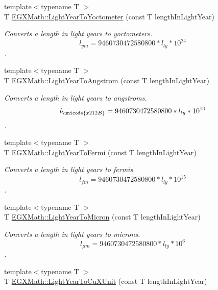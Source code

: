 \begin{DoxyCompactItemize}
{\footnotesize template$<$typename T $>$ }\\T \mbox{\hyperlink{group___e_g_x_math-_conversions-_length_conversions-_astronomical-_light_year-_s_i_ga2e306829867215c96b04e558db7d15b9}{E\+G\+X\+Math\+::\+Light\+Year\+To\+Yoctometer}} (const T length\+In\+Light\+Year)
\begin{DoxyCompactList}\small\item\em Converts a length in light years to yoctometers. \[ l_{ym}=9460730472580800 * l_{ly} * 10^{24} \]. \end{DoxyCompactList}\item 
{\footnotesize template$<$typename T $>$ }\\T \mbox{\hyperlink{group___e_g_x_math-_conversions-_length_conversions-_astronomical-_light_year-_non-_s_i_ga09634a7c514e3a0f573e7c171a791f78}{E\+G\+X\+Math\+::\+Light\+Year\+To\+Angstrom}} (const T length\+In\+Light\+Year)
\begin{DoxyCompactList}\small\item\em Converts a length in light years to angstroms. \[ l_{\unicode{x212B}}=9460730472580800 * l_{ly} * 10^{10} \]. \end{DoxyCompactList}\item 
{\footnotesize template$<$typename T $>$ }\\T \mbox{\hyperlink{group___e_g_x_math-_conversions-_length_conversions-_astronomical-_light_year-_non-_s_i_gaf3a2acd1e1653e2cecd6c299abe78524}{E\+G\+X\+Math\+::\+Light\+Year\+To\+Fermi}} (const T length\+In\+Light\+Year)
\begin{DoxyCompactList}\small\item\em Converts a length in light years to fermis. \[ l_{fm}=9460730472580800 * l_{ly} * 10^{15} \]. \end{DoxyCompactList}\item 
{\footnotesize template$<$typename T $>$ }\\T \mbox{\hyperlink{group___e_g_x_math-_conversions-_length_conversions-_astronomical-_light_year-_non-_s_i_gaa1be4e14f5ac7b272f28ce3e115b61c7}{E\+G\+X\+Math\+::\+Light\+Year\+To\+Micron}} (const T length\+In\+Light\+Year)
\begin{DoxyCompactList}\small\item\em Converts a length in light years to microns. \[ l_{\mu m}=9460730472580800 * l_{ly} * 10^{6} \]. \end{DoxyCompactList}\item 
{\footnotesize template$<$typename T $>$ }\\T \mbox{\hyperlink{group___e_g_x_math-_conversions-_length_conversions-_astronomical-_light_year-_non-_s_i_ga2a345996e344d547ea6db8b7e9174ae8}{E\+G\+X\+Math\+::\+Light\+Year\+To\+Cu\+X\+Unit}} (const T length\+In\+Light\+Year)

\end{DoxyCompactItemize}
